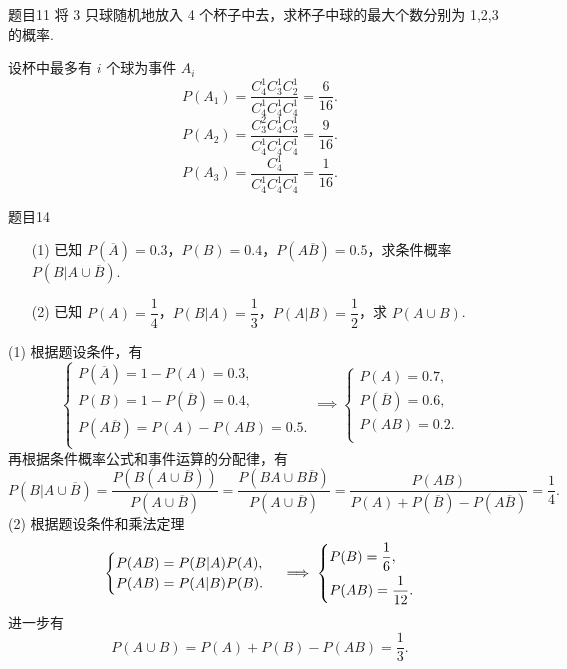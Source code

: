 \begin{question}{题目11}
    将 3 只球随机地放入 4 个杯子中去，求杯子中球的最大个数分别为 1,2,3 的概率.
\end{question}
\begin{solution}
    设杯中最多有 $i$ 个球为事件 $A_i$
    $$
        P(A_1) = \frac{C_4^1C_3^1C_2^1}{C_4^1C_4^1C_4^1} = \frac{6}{16}.
    $$
    $$
        P(A_2) = \frac{C_3^2C_4^1C_3^1}{C_4^1C_4^1C_4^1} = \frac{9}{16}.
    $$
    $$
        P(A_3) = \frac{C_4^1}{C_4^1C_4^1C_4^1} = \frac{1}{16}.
    $$
\end{solution}

\begin{question}{题目14}
    \begin{itemize}
        \item [(1)] 已知 $P(\overline{A}) = 0.3$，$P(B) = 0.4$，$P(A\overline{B}) = 0.5$，求条件概率 $P(B|A \cup \overline{B})$.
        \item [(2)] 已知 $P(A) = \dfrac{1}{4}$，$P(B|A) = \dfrac{1}{3}$，$P(A|B) = \dfrac{1}{2}$，求 $P(A \cup B)$.
    \end{itemize}
\end{question}
\begin{solution}
    (1) 根据题设条件，有
    $$
        \begin{cases}
            P(\overline{A}) = 1 - P(A) = 0.3,      \\
            P(B) = 1 - P(\overline{B}) = 0.4,      \\
            P(A\overline{B}) = P(A) - P(AB) = 0.5. \\
        \end{cases}
        \implies
        \begin{cases}
            P(A) = 0.7,            \\
            P(\overline{B}) = 0.6, \\
            P(AB) = 0.2.           \\
        \end{cases}
    $$
    再根据条件概率公式和事件运算的分配律，有
    $$
        P(B|A\cup\overline{B})
        = \frac{P(B(A\cup\overline{B}))}{P(A\cup\overline{B})}
        = \frac{P(BA \cup B\overline{B})}{P(A\cup\overline{B})}
        = \frac{P(AB)}{P(A) + P(\overline{B}) - P(A\overline{B})}
        = \frac{1}{4}.
    $$
    (2) 根据题设条件和乘法定理
    $$
        \begin{cases}
            P(AB) = P(B|A)P(A), \\
            P(AB) = P(A|B)P(B). \\
        \end{cases}
        \implies
        \begin{dcases}
            P(B) = \frac{1}{6},   \\
            P(AB) = \frac{1}{12}. \\
        \end{dcases}
    $$
    进一步有
    $$
        P(A \cup B) = P(A) + P(B) - P(AB) = \frac{1}{3}.
    $$
\end{solution}

